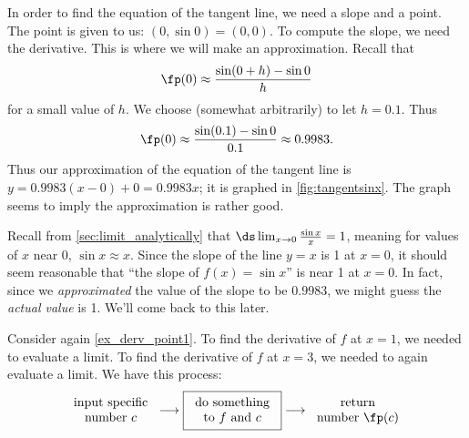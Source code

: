 {In order to find the equation of the tangent line, we need a slope and a point. The point is given to us: $(0,\sin 0) = (0,0)$. To compute the slope, we need the derivative. This is where we will make an approximation. Recall that
\[\fp(0) \approx \frac{\sin(0+h)- \sin 0}{h}\]
for a small value of $h$. We choose (somewhat arbitrarily) to let $h=0.1$. Thus
%
%
\[\fp(0) \approx \frac{\sin(0.1)-\sin 0}{0.1} \approx 0.9983.\]
Thus our approximation of the equation of the tangent line is $y = 0.9983(x-0) +0 = 0.9983x$; it is graphed in \autoref{fig:tangentsinx}. The graph seems to imply the approximation is rather good.}

Recall from \autoref{sec:limit_analytically} that $\ds \lim_{x\to 0}\frac{\sin x}x =1$, meaning for values of $x$ near 0, $\sin x \approx x$. Since the slope of the line $y=x$ is 1 at $x=0$, it should seem reasonable that ``the slope of $f(x)=\sin x$'' is near 1 at $x=0$. In fact, since we \textit{approximated} the value of the slope to be $0.9983$, we might guess the \textit{actual value} is 1. We'll come back to this later.\bigskip

Consider again \autoref{ex_derv_point1}. To find the derivative of $f$ at $x=1$, we needed to evaluate a limit. To find the derivative of $f$ at $x=3$, we needed to again evaluate a limit. We have this process:
\[
\begin{tabular}{c}input specific\\number $c$\end{tabular}
\longrightarrow
\fbox{\begin{tabular}{c}do something\\to $f$ and $c$\end{tabular}}
\longrightarrow
\begin{tabular}{c}return\\number $\fp(c)$\end{tabular}
\]

